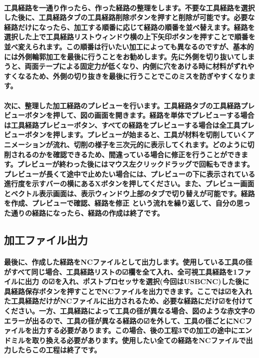 \documentclass[b5paper, 9pt, twocolumn, titlepage,openany]{jsbook}%
\begin{document}

\paragraph{工具経路を一通り作ったら、作った経路の整理をします。不要な工具経路を選択した後に、工具経路タブの工具経路削除ボタンを押すと削除が可能です。必要な経路だけになったら、加工する順番に応じて経路の順番を並べ替えます。経路を選択した上で工具経路リストウィンドウ横の上下矢印ボタンを押すことで順番を並べ変えられます。この順番は行いたい加工によっても異なるのですが、基本的には外側輪郭加工を最後に行うことをお勧めします。先に外側を切り抜いてしまうと、両面テープによる固定力が低くなり、内側に穴をあける時に材料がずれやすくなるため、外側の切り抜きを最後に行うことでこのミスを防ぎやすくなります。}

\paragraph{次に、整理した加工経路のプレビューを行います。工具経路タブの工具経路プレビューボタンを押して、図の画面を開きます。経路を単体でプレビューする場合は工具経路プレビューボタン、すべての経路をプレビューする場合は全工具プレビューボタンを押します。プレビューが始まると、工具が材料を切削していくアニメーションが流れ、切削の様子を三次元的に表示してくれます。どのように切削されるのかを確認できるため、間違っている場合に修正を行うことができます。プレビューが終わった後にはマウス左クリックドラッグで回転もできます。プレビューが長くて途中で止めたい場合には、プレビューの下に表示されている進行度を示すバーの横にあるXボタンを押してください。また、プレビュー画面とベクトル表示画面は、表示ウィンドウ上部のタブで切り替えが可能です。経路を作成、プレビューで確認、経路を修正 という流れを繰り返して、自分の思った通りの経路になったら、経路の作成は終了です。}


\subsection{加工ファイル出力}

\paragraph{最後に、作成した経路をNCファイルとして出力します。使用している工具の径がすべて同じ場合、工具経路リストの☑欄を全て入れ、全可視工具経路を1ファイルに出力 の☑を入れ、ポストプロセッサを選択(今回はUSBCNC)した後に具経路保存ボタンを押すことでNCファイルを出力できます。ここでは☑を入れた工具経路だけがNCファイルに出力されるため、必要な経路にだけ☑を付けてください。一方、工具経路によって工具の径が異なる場合、図のような赤文字のエラーが出るので、工具の径が異なる経路の☑を外して、工具の径ごとにNCファイルを出力する必要があります。この場合、後の工程3での加工の途中にエンドミルを取り換える必要があります。使用したい全ての経路をNCファイルで出力したらこの工程は終了です。}
\end{document}
